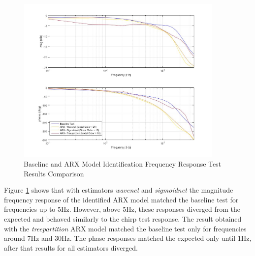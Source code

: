 \begin{figure}[H]
	\centering
	\centerline{\includegraphics[width=0.9\textwidth]{Figuras/A.FrequencyResponseTest/A-ARXScriptResults.jpg}}
	\caption{Baseline and ARX Model Identification Frequency Response Test Results Comparison}
	\label{fig:A_ARXScripResults}
\end{figure}

Figure \ref{fig:A_ARXScripResults} shows that with estimators \textit{wavenet} and \textit{sigmoidnet} the magnitude frequency response of the identified ARX model matched the baseline test for frequencies up to 5Hz. However, above 5Hz, these responses diverged from the expected and behaved similarly to the chirp test response. The result obtained with the \textit{treepartition} ARX model matched the baseline test only for frequencies around 7Hz and 30Hz. The phase responses matched the expected only until 1Hz, after that results for all estimators diverged.

\begin{table}[H]
	\label{table:A_ARXScripResults}
	\centering
\end{table}

